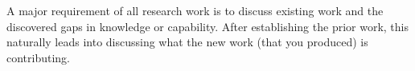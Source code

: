 \label{chap:related_work}
A major requirement of all research work is to discuss existing work and the discovered gaps in knowledge or capability. After establishing the prior work, this naturally leads into discussing what the new work (that you produced) is contributing.